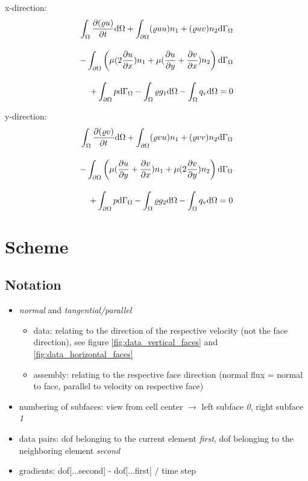 \documentclass[a4paper,10pt]{scrartcl}
\begin{document}
x-direction:
\begin{equation}
\begin{split}
  \int_{\Omega} \frac{\partial (\varrho u)}{\partial t} \text{d} \Omega + \int_{\partial \Omega} (\varrho u u)n_1 + (\varrho u v)n_2 \text{d} \Gamma_{\Omega} \\[1em]
    - \int_{\partial \Omega} \left(\mu (2\frac{\partial u}{\partial x})n_1 + \mu (\frac{\partial u}{\partial y} + \frac{\partial v}{\partial x})n_2 \right) \text{d} \Gamma_{\Omega} \\[1em]
    + \int_{\partial \Omega} p \text{d} \Gamma_{\Omega} - \int_{\Omega} \varrho g_1 \text{d} \Omega - \int_{\Omega} q_{\textup{v}} \text{d} \Omega = 0     
\end{split}
\end{equation}

y-direction:
\begin{equation}
\begin{split}
  \int_{\Omega} \frac{\partial (\varrho v)}{\partial t} \text{d} \Omega + \int_{\partial \Omega} (\varrho v u)n_1 + (\varrho v v)n_2 \text{d} \Gamma_{\Omega} \\[1em]
    - \int_{\partial \Omega} \left(\mu (\frac{\partial u}{\partial y} + \frac{\partial v}{\partial x})n_1 + \mu (2\frac{\partial v}{\partial y})n_2\right) \text{d} \Gamma_{\Omega} \\[1em]
    + \int_{\partial \Omega} p \text{d} \Gamma_{\Omega} - \int_{\Omega} \varrho g_2 \text{d} \Omega - \int_{\Omega} q_{\textup{v}} \text{d} \Omega = 0     
\end{split}
\end{equation}

\section{Scheme}
\subsection{Notation}
\begin{itemize}
 \item \textit{normal} and \textit{tangential/parallel}
 \begin{itemize}
  \item data: relating to the direction of the respective velocity (not the face direction), see figure \ref{fig:data_vertical_faces} and \ref{fig:data_horizontal_faces}
  \item assembly: relating to the respective face direction (normal flux = normal to face, parallel to velocity on respective face)
 \end{itemize}
 \item numbering of subfaces: view from cell center $\rightarrow$ left subface \textit{0}, right subface \textit{1}
 \item data pairs: dof belonging to the current element \textit{first}, dof belonging to the neighboring element \textit{second}
 \item gradients: dof[...second] - dof[...first] / time step
\end{itemize}
\end{document}
